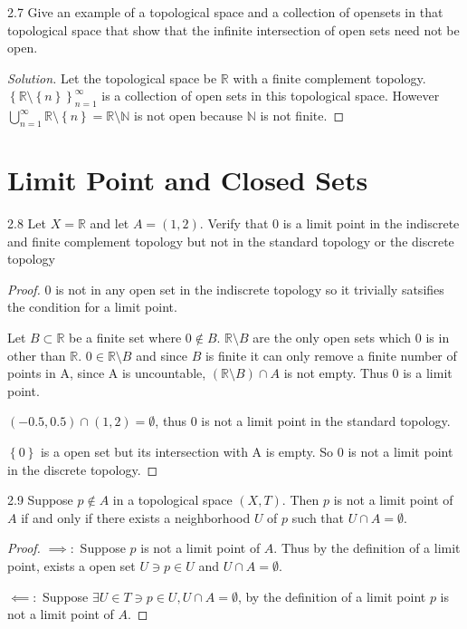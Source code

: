\documentclass{article}
\newcommand{\R}{\mathbb{R}}
\newcommand{\N}{\mathbb{N}}
\newenvironment{solution}
{\renewcommand\qedsymbol{$\blacksquare$}\begin{proof}[Solution]}
{\end{proof}}
\begin{document}
\bigskip

\begin{PROB}{2.7}\label{Problem 2.7.}
    Give an example of a topological space and a collection of opensets in that topological space that show that the infinite intersection of open sets need not be open.
\end{PROB}
\begin{solution}
    Let the topological space be $\R$ with a finite complement topology. $\left\{ \R \setminus \left\{ n \right\} \right\}_{n = 1}^{\infty}$ is a collection of open sets in this topological space. However $\bigcup_{n = 1}^{\infty} \R \setminus \left\{ n \right\} = \R \setminus \N$ is not open because $\N$ is not finite.     
\end{solution}

\section*{Limit Point and Closed Sets}
\begin{PROB}{2.8}\label{Problem 2.8.}
    Let $X = \R$ and let $A = (1, 2)$. Verify that 0 is a limit point in the indiscrete and finite complement topology but not in the standard topology or the discrete topology  
\end{PROB}
\begin{proof}
    $0$ is not in any open set in the indiscrete topology so it trivially satsifies the condition for a limit point. 

    Let $B \subset \R$ be a finite set where $0 \not \in B$. $\R \setminus B$ are the only open sets which 0 is in other than $\R$. $0 \in \R \setminus B$ and since $B$ is finite it can only remove a finite number of points in A, since A is uncountable, $(\R \setminus B) \cap A$ is not empty. Thus 0 is a limit point.
    
    $(-0.5, 0.5) \cap (1, 2) = \emptyset$, thus 0 is not a limit point in the standard topology. 
    
    $\left\{ 0 \right\}$ is a open set but its intersection with A is empty. So 0 is not a limit point in the discrete topology. 
\end{proof}

\bigskip

\begin{claim}{2.9}\label{Claim 2.9.}
    Suppose $p \not \in A$ in a topological space $(X, T)$. Then $p$ is not a limit point of $A$ if and only if there exists a neighborhood $U$ of $p$ such that $U \cap A = \emptyset$.  
\end{claim}
\begin{proof}
    $\implies:$ Suppose $p$ is not a limit point of $A$. Thus by the definition of a limit point, exists a open set $U \ni p \in U$ and $U \cap A = \emptyset$.
    
    $\impliedby:$ Suppose $\exists U \in T \ni p \in U, U \cap A = \emptyset$, by the definition of a limit point $p$ is not a limit point of $A$.     
\end{proof}
\end{document}
